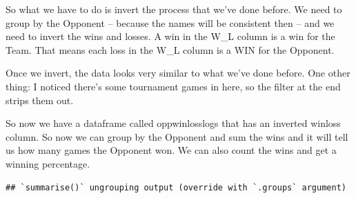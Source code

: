 \documentclass[
]{book}
\newenvironment{Shaded}{\begin{snugshade}}{\end{snugshade}}
\newcommand{\DataTypeTok}[1]{\textcolor[rgb]{0.13,0.29,0.53}{#1}}
\newcommand{\DecValTok}[1]{\textcolor[rgb]{0.00,0.00,0.81}{#1}}
\newcommand{\KeywordTok}[1]{\textcolor[rgb]{0.13,0.29,0.53}{\textbf{#1}}}
\newcommand{\NormalTok}[1]{#1}
\newcommand{\OperatorTok}[1]{\textcolor[rgb]{0.81,0.36,0.00}{\textbf{#1}}}
\newcommand{\StringTok}[1]{\textcolor[rgb]{0.31,0.60,0.02}{#1}}
\begin{document}
So what we have to do is invert the process that we've done before. We need to group by the Opponent -- because the names will be consistent then -- and we need to invert the wins and losses. A win in the W\_L column is a win for the Team. That means each loss in the W\_L column is a WIN for the Opponent.

Once we invert, the data looks very similar to what we've done before. One other thing: I noticed there's some tournament games in here, so the filter at the end strips them out.

\begin{Shaded}
\end{Shaded}

So now we have a dataframe called oppwinlosslogs that has an inverted winloss column. So now we can group by the Opponent and sum the wins and it will tell us how many games the Opponent won. We can also count the wins and get a winning percentage.

\begin{Shaded}
\end{Shaded}

\begin{verbatim}
## `summarise()` ungrouping output (override with `.groups` argument)
\end{verbatim}
\end{document}
